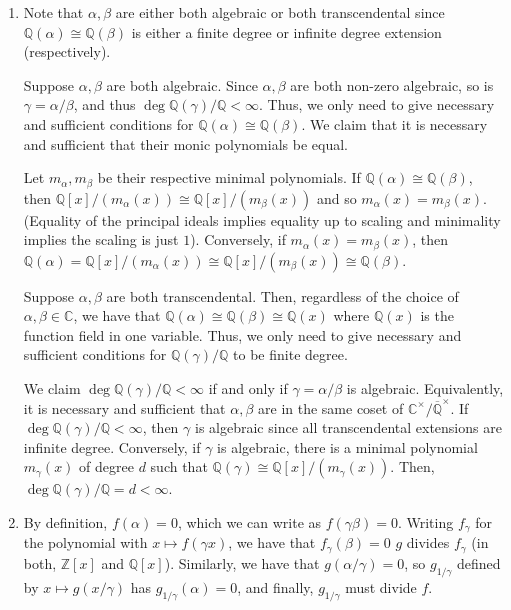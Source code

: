 \documentclass[12 pt, letterpaper]{hmcpset}
\begin{document}
\begin{solution}
	\begin{enumerate}
		\item Note that $\alpha, \beta$ are either both algebraic or both transcendental since $\mathbb{Q}(\alpha) \cong \mathbb{Q}(\beta)$ is either a finite degree or infinite degree extension (respectively).

			Suppose $\alpha, \beta$ are both algebraic. Since $\alpha, \beta$ are both non-zero algebraic, so is $\gamma = \alpha / \beta$, and thus $\deg \mathbb{Q}(\gamma) / \mathbb{Q} < \infty$. Thus, we only need to give necessary and sufficient conditions for $\mathbb{Q}(\alpha) \cong \mathbb{Q}(\beta)$. We claim that it is necessary and sufficient that their monic polynomials be equal.

			Let $m_{\alpha}, m_{\beta}$ be their respective minimal polynomials. If $\mathbb{Q}(\alpha) \cong \mathbb{Q}(\beta)$, then $\mathbb{Q}[x] / (m_{\alpha}(x)) \cong \mathbb{Q}[x] / (m_{\beta}(x))$ and so $m_{\alpha}(x) = m_{\beta}(x)$. (Equality of the principal ideals implies equality up to scaling and minimality implies the scaling is just $1$). Conversely, if $m_{\alpha}(x) = m_{\beta}(x)$, then $\mathbb{Q}(\alpha) = \mathbb{Q}[x]/(m_{\alpha}(x)) \cong \mathbb{Q}[x]/(m_{\beta}(x)) \cong \mathbb{Q}(\beta)$.

			Suppose $\alpha, \beta$ are both transcendental. Then, regardless of the choice of $\alpha, \beta \in \mathbb{C}$, we have that $\mathbb{Q}(\alpha) \cong \mathbb{Q}(\beta) \cong \mathbb{Q}(x)$ where $\mathbb{Q}(x)$ is the function field in one variable. Thus, we only need to give necessary and sufficient conditions for $\mathbb{Q}(\gamma) / \mathbb{Q}$ to be finite degree. 

			We claim $\deg \mathbb{Q}(\gamma) / \mathbb{Q} < \infty$ if and only if $\gamma = \alpha / \beta$ is algebraic. Equivalently, it is necessary and sufficient that $\alpha, \beta$ are in the same coset of $\mathbb{C}^{\times} / \overline{\mathbb{Q}}^{\times}$. If $\deg \mathbb{Q}(\gamma) / \mathbb{Q} < \infty$, then $\gamma$ is algebraic since all transcendental extensions are infinite degree. Conversely, if $\gamma$ is algebraic, there is a minimal polynomial $m_{\gamma}(x)$ of degree $d$ such that $\mathbb{Q}(\gamma) \cong \mathbb{Q}[x] / (m_{\gamma}(x))$. Then, $\deg \mathbb{Q}(\gamma) / \mathbb{Q} = d < \infty$.

		\item By definition, $f(\alpha) = 0$, which we can write as $f(\gamma \beta) = 0$. Writing $f_{\gamma}$ for the polynomial with $x \mapsto f(\gamma x)$, we have that $f_{\gamma}(\beta) = 0$ $g$ divides $f_{\gamma}$ (in both, $\mathbb{Z}[x]$ and $\mathbb{Q}[x]$). Similarly, we have that $g(\alpha / \gamma) = 0$, so $g_{1 / \gamma}$ defined by $x \mapsto g(x / \gamma)$ has $g_{1 / \gamma}(\alpha) = 0$, and finally, $g_{1 / \gamma}$ must divide $f$.


\end{enumerate}
\end{solution}
\end{document}
